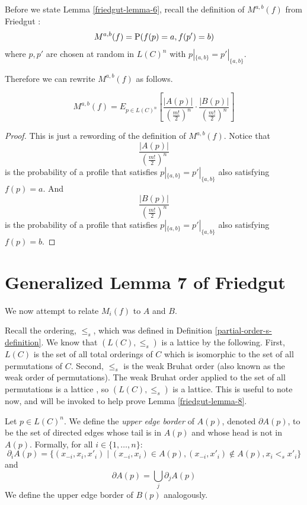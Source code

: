	Before we state Lemma \ref{friedgut-lemma-6}, recall the definition of $M^{a,b}(f)$ from Friedgut \cite{friedgut2008elections}:
	\[
		M^{a,b}(f) = \operatorname{P}(f(p) = a, f(p') = b)
	\]
	where $p, p'$ are chosen at random in $L(C)^n$ with $p|_{\{a,b\}} = p'|_{\{a,b\}}$.

	Therefore we can rewrite $M^{a,b}(f)$ as follows.

	\begin{lemma}
		\label{friedgut-lemma-6}
		\[
			M^{a,b}(f) = E_{p \in L(C)^n} \left[ \frac{|A(p)|}{\left(\frac{m!}{2}\right)^n} \cdot \frac{|B(p)|}{\left(\frac{m!}{2}\right)^n} \right]
		\]
	\end{lemma}
	\begin{proof}
		This is just a rewording of the definition of $M^{a,b}(f)$. Notice that
		\[
			\frac{|A(p)|}{\left(\frac{m!}{2}\right)^n}
		\]
		is the probability of a profile that satisfies $p|_{\{a,b\}} = p'|_{\{a,b\}}$ also satisfying $f(p) = a$. And
		\[
			\frac{|B(p)|}{\left(\frac{m!}{2}\right)^n}
		\]
		is the probability of a profile that satisfies $p|_{\{a,b\}} = p'|_{\{a,b\}}$ also satisfying $f(p) = b$.
	\end{proof}


\section{Generalized Lemma 7 of Friedgut}

	We now attempt to relate $M_i(f)$ to $A$ and $B$.

	Recall the ordering, $\le_s$, which was defined in Definition \ref{partial-order-s-definition}. We know that $(L(C), \le_s)$ is a lattice by the following. First, $L(C)$ is the set of all total orderings of $C$ which is isomorphic to the set of all permutations of $C$. Second, $\le_s$ is the weak Bruhat order (also known as the weak order of permutations). The weak Bruhat order applied to the set of all permutations is a lattice \cite{bjorner1984orderings}, so $(L(C), \le_s)$ is a lattice. This is useful to note now, and will be invoked to help prove Lemma \ref{friedgut-lemma-8}.

	\begin{definition}
		Let $p \in L(C)^n$. We define the \emph{upper edge border} of $A(p)$, denoted $\partial A(p)$, to be the set of directed edges whose tail is in $A(p)$ and whose head is not in $A(p)$. Formally, for all $i \in \{1, \ldots, n\}$:
			\[
				\partial_i A(p) = \{ (x_{-i}, x_i, x'_i) \mid (x_{-i}, x_i) \in A(p), (x_{-i}, x'_i) \notin A(p), x_i <_s x'_i \}
			\]
		and
			\[
				\partial A(p) = \bigcup_j \partial_j A(p)
			\]
		We define the upper edge border of $B(p)$ analogously.
	\end{definition}

